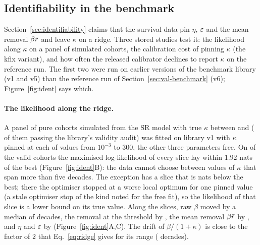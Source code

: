 \subsection{Identifiability in the benchmark}\label{sec:val-ident}

Section~\ref{sec:identifiability} claims that the survival data pin $\eta$, $\varepsilon$ and the mean removal $\beta\bar r$ and
leave $\kappa$ on a ridge. Three stored studies test it: the likelihood along $\kappa$ on a panel of simulated
cohorts, the calibration cost of pinning $\kappa$ (the kfix variant), and how often the released calibrator declines to
report $\kappa$ on the reference run. The first two were run on earlier versions of the benchmark library (v1 and v5) than the
reference run of Section~\ref{sec:val-benchmark} (v6); Figure~\ref{fig:ident} says which.

\paragraph{The likelihood along the ridge.} A panel of  pure cohorts simulated from the SR model with
true $\kappa$ between  and  ( of them passing the library's validity
audit) was fitted on library v1 with $\kappa$ pinned at each of  values from $10^{-3}$ to $300$, the other three
parameters free. On  of the  valid cohorts the maximised log-likelihood of every slice lay
within $1.92$ nats of the best (Figure~\ref{fig:ident}B): the data cannot choose between values of $\kappa$ that span more than
five decades. The exception has a slice that is  nats below the best; there the optimiser stopped at a
worse local optimum for one pinned value (a stale optimiser stop of the kind noted for the free fit), so the likelihood of that slice is a lower bound on its true value. Along the slices, raw $\beta$ moved by a median of
 decades, the removal at the threshold by , the mean removal $\beta\bar r$ by
, and $\eta$ and $\varepsilon$ by  (Figure~\ref{fig:ident}A,C). The drift of $\beta/(1+\kappa)$ is
close to the factor of $2$ that Eq.~\eqref{eq:ridge} gives for its range ( decades).

